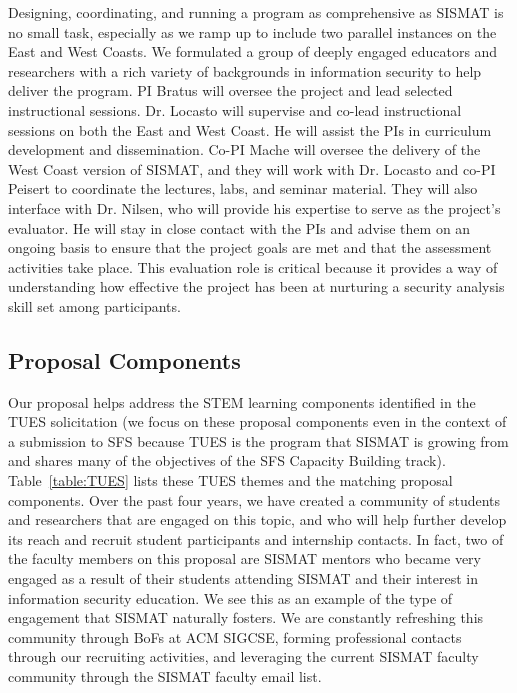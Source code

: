 Designing, coordinating, and running a program as comprehensive as
SISMAT is no small task, especially as we ramp up to include two
parallel instances on the East and West Coasts.  We formulated a group
of deeply engaged educators and researchers with a rich variety of
backgrounds in information security to help deliver the program.  PI
Bratus will oversee the project and lead selected instructional
sessions.  Dr. Locasto will supervise and co-lead instructional
sessions on both the East and West Coast.  He will assist the PIs in
curriculum development and dissemination.  Co-PI Mache will oversee
the delivery of the West Coast version of SISMAT, and they will work
with Dr. Locasto and co-PI Peisert to coordinate the lectures, labs,
and seminar material.  They will also interface with Dr. Nilsen, who
will provide his expertise to serve as the project's evaluator.  He
will stay in close contact with the PIs and advise them on an ongoing
basis to ensure that the project goals are met and that the assessment
activities take place.  This evaluation role is critical because it
provides a way of understanding how effective the project has been at
nurturing a security analysis skill set among participants.

\subsection{Proposal Components}

Our proposal helps address the STEM learning components identified in
the TUES solicitation (we focus on these proposal components even in
the context of a submission to SFS because TUES is the program that
SISMAT is growing from and shares many of the objectives of the SFS
Capacity Building track).  Table~\ref{table:TUES} lists these TUES
themes and the matching proposal components.  Over the past four
years, we have created a community of students and researchers that
are engaged on this topic, and who will help further develop its reach
and recruit student participants and internship contacts.  In fact,
two of the faculty members on this proposal are SISMAT mentors who
became very engaged as a result of their students attending SISMAT and
their interest in information security education.  We see this as an
example of the type of engagement that SISMAT naturally fosters.  We
are constantly refreshing this community through BoFs at ACM SIGCSE,
forming professional contacts through our recruiting activities, and
leveraging the current SISMAT faculty community through the SISMAT
faculty email list.

